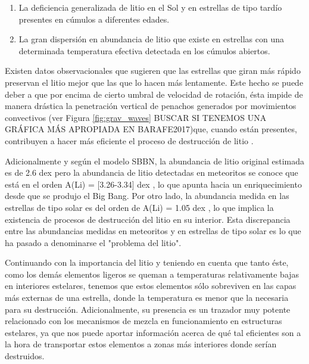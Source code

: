 \begin{enumerate}
    \item La deficiencia generalizada de litio en el Sol y en estrellas de tipo tardío presentes en cúmulos a diferentes edades.
    \item La gran dispersión en abundancia de litio que existe en estrellas con una determinada temperatura efectiva detectada en los cúmulos abiertos.
\end{enumerate}

Existen datos observacionales que sugieren que las estrellas que giran más rápido preservan el litio mejor que las que lo hacen más lentamente. Este hecho se puede deber a que por encima de cierto umbral de velocidad de rotación, ésta impide de manera drástica la penetración vertical de penachos generados por movimientos convectivos (ver Figura \ref{fig:grav_waves} BUSCAR SI TENEMOS UNA GRÁFICA MÁS APROPIADA EN BARAFE2017)que, cuando están presentes, contribuyen a hacer más eficiente el proceso de destrucción de litio \citep{Baraffe2017}.\par

Adicionalmente y según el modelo SBBN, la abundancia de litio original estimada es de 2.6 dex \citep{Spergel2003} pero la abundancia de litio detectadas en meteoritos se conoce que está en el orden A(Li) = [3.26-3.34] dex \citep{Randich2006, Grevesse2007}, lo que apunta hacia un enriquecimiento desde que se produjo el Big Bang. Por otro lado, la abundancia medida en las estrellas de tipo solar es del orden de A(Li) = 1.05 dex \citep{Grevesse2007}, lo que implica la existencia de procesos de destrucción del litio en su interior. Esta discrepancia entre las abundancias medidas en meteoritos y en estrellas de tipo solar es lo que ha pasado a denominarse el "problema del litio".\par

Continuando con la importancia del litio y teniendo en cuenta que tanto éste, como los demás elementos ligeros se queman a temperaturas relativamente bajas en interiores estelares, tenemos que estos elementos sólo sobreviven en las capas más externas de una estrella, donde la temperatura es menor que la necesaria para su destrucción. Adicionalmente, su presencia es un trazador muy potente relacionado con los mecanismos de mezcla en funcionamiento en estructuras estelares, ya que nos puede aportar información acerca de qué tal eficientes son a la hora de transportar estos elementos a zonas más interiores donde serían destruidos.\par

